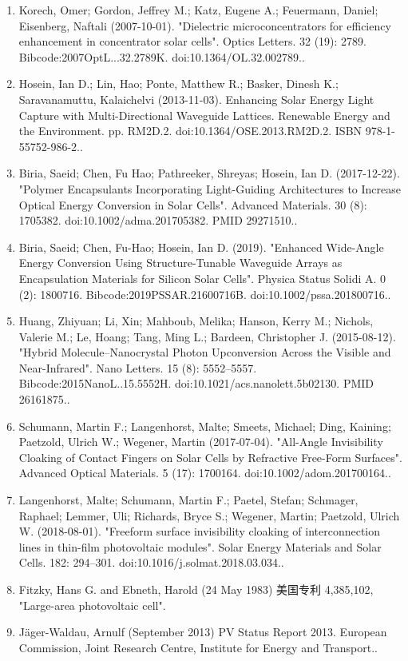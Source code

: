 \begin{enumerate}
\item Korech, Omer; Gordon, Jeffrey M.; Katz, Eugene A.; Feuermann, Daniel; Eisenberg, Naftali (2007-10-01). "Dielectric microconcentrators for efficiency enhancement in concentrator solar cells". Optics Letters. 32 (19): 2789. Bibcode:2007OptL...32.2789K. doi:10.1364/OL.32.002789..
\item Hosein, Ian D.; Lin, Hao; Ponte, Matthew R.; Basker, Dinesh K.; Saravanamuttu, Kalaichelvi (2013-11-03). Enhancing Solar Energy Light Capture with Multi-Directional Waveguide Lattices. Renewable Energy and the Environment. pp. RM2D.2. doi:10.1364/OSE.2013.RM2D.2. ISBN 978-1-55752-986-2..
\item Biria, Saeid; Chen, Fu Hao; Pathreeker, Shreyas; Hosein, Ian D. (2017-12-22). "Polymer Encapsulants Incorporating Light-Guiding Architectures to Increase Optical Energy Conversion in Solar Cells". Advanced Materials. 30 (8): 1705382. doi:10.1002/adma.201705382. PMID 29271510..
\item Biria, Saeid; Chen, Fu-Hao; Hosein, Ian D. (2019). "Enhanced Wide-Angle Energy Conversion Using Structure-Tunable Waveguide Arrays as Encapsulation Materials for Silicon Solar Cells". Physica Status Solidi A. 0 (2): 1800716. Bibcode:2019PSSAR.21600716B. doi:10.1002/pssa.201800716..
\item Huang, Zhiyuan; Li, Xin; Mahboub, Melika; Hanson, Kerry M.; Nichols, Valerie M.; Le, Hoang; Tang, Ming L.; Bardeen, Christopher J. (2015-08-12). "Hybrid Molecule–Nanocrystal Photon Upconversion Across the Visible and Near-Infrared". Nano Letters. 15 (8): 5552–5557. Bibcode:2015NanoL..15.5552H. doi:10.1021/acs.nanolett.5b02130. PMID 26161875..
\item Schumann, Martin F.; Langenhorst, Malte; Smeets, Michael; Ding, Kaining; Paetzold, Ulrich W.; Wegener, Martin (2017-07-04). "All-Angle Invisibility Cloaking of Contact Fingers on Solar Cells by Refractive Free-Form Surfaces". Advanced Optical Materials. 5 (17): 1700164. doi:10.1002/adom.201700164..
\item Langenhorst, Malte; Schumann, Martin F.; Paetel, Stefan; Schmager, Raphael; Lemmer, Uli; Richards, Bryce S.; Wegener, Martin; Paetzold, Ulrich W. (2018-08-01). "Freeform surface invisibility cloaking of interconnection lines in thin-film photovoltaic modules". Solar Energy Materials and Solar Cells. 182: 294–301. doi:10.1016/j.solmat.2018.03.034..
\item Fitzky, Hans G. and Ebneth, Harold (24 May 1983) 美国专利 4,385,102, "Large-area photovoltaic cell".
\item Jäger-Waldau, Arnulf (September 2013) PV Status Report 2013. European Commission, Joint Research Centre, Institute for Energy and Transport..

\end{enumerate}
